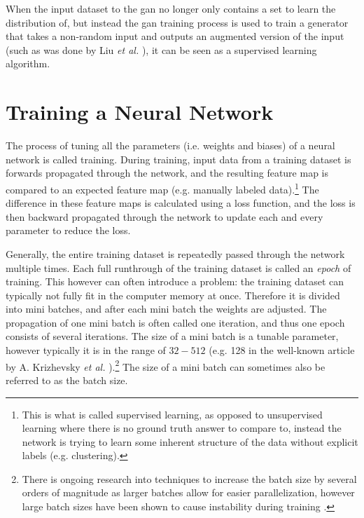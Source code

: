 When the input dataset to the \gls{gan} no longer only contains a set to learn the distribution of, but instead the \gls{gan} training process is used to train a generator that takes a non-random input and outputs an augmented version of the input (such as was done by Liu \textit{et al.} \cite{liu2020tomogan}), it can be seen as a supervised learning algorithm.

\section{Training a Neural Network}
The process of tuning all the parameters (i.e. weights and biases) of a neural network is called training. During training, input data from a training dataset is forwards propagated through the network, and the resulting feature map is compared to an expected feature map (e.g. manually labeled data).\footnote{This is what is called supervised learning, as opposed to unsupervised learning where there is no ground truth answer to compare to, instead the network is trying to learn some inherent structure of the data without explicit labels (e.g. clustering). } The difference in these feature maps is calculated using a loss function, and the loss is then backward propagated through the network to update each and every parameter to reduce the loss. 


Generally, the entire training dataset is repeatedly passed through the network multiple times. Each full runthrough of the training dataset is called an \textit{epoch} of training. This however can often introduce a problem: the training dataset can typically not fully fit in the computer memory at once. Therefore it is divided into mini batches, and after each mini batch the weights are adjusted. The propagation of one mini batch is often called one iteration, and thus one epoch consists of several iterations. The size of a mini batch is a tunable parameter, however typically it is in the range of $32-512$ (e.g. 128 in the well-known article by A. Krizhevsky \textit{et al.} \cite{alexnet}).\footnote{There is ongoing research into techniques to increase the batch size by several orders of magnitude as larger batches allow for easier parallelization, however large batch sizes have been shown to cause instability during training \cite{you2017large}. } The size of a mini batch can sometimes also be referred to as the batch size. 

